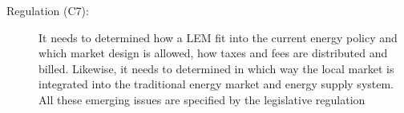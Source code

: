 \begin{description}
    \item[Regulation (C7):] It needs to determined how a LEM 
     fit into the current energy policy and which market design is allowed, how 
     taxes and fees are distributed and billed. Likewise, it needs to 
     determined in which way the local market is integrated into the traditional
     energy market and energy supply system.
     All these emerging issues are specified by the legislative regulation
    
\end{description}

\begin{comment}
    # Mengelkamp \shortcite{mengelkamp2018designing}
    
    An exemplary microgrid energy market scenario of residential consumers and 
    prosumers (consumers with photovoltaic (PV) systems) is shown in Fig. 2. 

\end{comment}

\clearpage